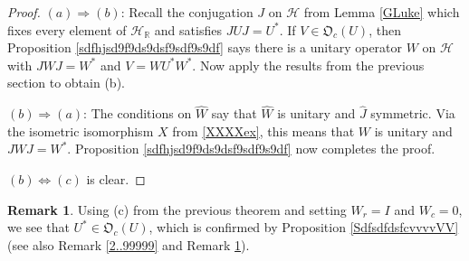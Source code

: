 \documentclass{dis}
\theoremstyle{plain}
\theoremstyle{definition}
\newtheorem{Remark}[equation]{Remark}
\def\R{\mathbb{R}}
\newcommand{\0}{{\color{lightgray}0}}
\begin{document}
\begin{proof}
$(a) \Longrightarrow (b)$: Recall the conjugation $J$ on $\mathcal{H}$ from Lemma \ref{GLuke} which fixes every element of $\mathcal{H}_{\R}$ and satisfies $J U J = U^{*}$.  If $V \in \mathfrak{O}_c(U)$, then Proposition \ref{sdfhjsd9f9ds9dsf9sdf9s9df} says there is a unitary operator $W$ on $\mathcal{H}$ with $J W J = W^{*}$ and $V = W U^{*} W^{*}$. Now apply the results from the previous section to obtain (b).

$(b) \Longrightarrow (a)$: The conditions on $\widehat{W}$ say that $\widehat{W}$ is unitary and $\widehat{J}$ symmetric. Via the isometric isomorphism $X$ from \eqref{XXXXex}, this means that $W$ is unitary and $J W J = W^{*}$. Proposition \ref{sdfhjsd9f9ds9dsf9sdf9s9df} now completes the proof.

$(b) \iff (c)$ is clear.
\end{proof}

\begin{Remark}\label{sdfsdfRemaRKUU***}
Using (c) from the previous theorem and setting $W_{r} = I$ and $W_{c} = 0$, we see that $U^{*} \in \mathfrak{O}_c(U)$, which is confirmed by Proposition \ref{SdfsdfdsfcvvvvVV} (see also Remark \ref{2..99999} and Remark \ref{sdfsdfRemaRKUU***}).
\end{Remark}
\end{document}

